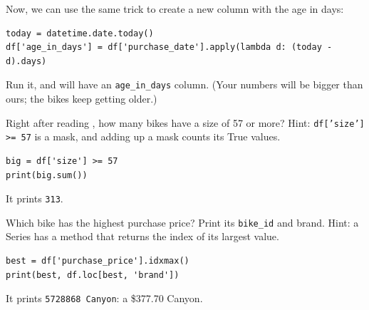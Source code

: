 Now, we can use the same trick to create a new column with the age in days:
\begin{verbatim}
today = datetime.date.today()
df['age_in_days'] = df['purchase_date'].apply(lambda d: (today - d).days)
\end{verbatim}

Run it, and  will have an \texttt{age\_in\_days}
column. (Your numbers will be bigger than ours; the bikes keep getting
older.)

\begin{Exercise}[title={Big bikes}, label=pd_big]
Right after reading , how many bikes have a size of 57
or more? Hint: \texttt{df['size'] >= 57} is a mask, and
adding up a mask counts its True values.
\end{Exercise}
\begin{Answer}[ref=pd_big]
\begin{verbatim}
big = df['size'] >= 57
print(big.sum())
\end{verbatim}
It prints \texttt{313}.
\end{Answer}

\begin{Exercise}[title={The fanciest bike}, label=pd_max]
Which bike has the highest purchase price? Print its \texttt{bike\_id} and
brand. Hint: a Series has a method  that returns the
index of its largest value.
\end{Exercise}
\begin{Answer}[ref=pd_max]
\begin{verbatim}
best = df['purchase_price'].idxmax()
print(best, df.loc[best, 'brand'])
\end{verbatim}
It prints \texttt{5728868 Canyon}: a \$377.70 Canyon.
\end{Answer}
